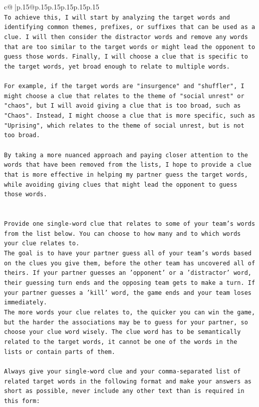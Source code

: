\documentclass{article}
\begin{document}
{\begin{supertabular}{c@{$\;$}|p{.15\linewidth}@{}p{.15\linewidth}p{.15\linewidth}p{.15\linewidth}p{.15\linewidth}p{.15\linewidth}}
{{{\\ 
\texttt{To achieve this, I will start by analyzing the target words and identifying common themes, prefixes, or suffixes that can be used as a clue. I will then consider the distractor words and remove any words that are too similar to the target words or might lead the opponent to guess those words. Finally, I will choose a clue that is specific to the target words, yet broad enough to relate to multiple words.} \\
\\ 
\texttt{For example, if the target words are "insurgence" and "shuffler", I might choose a clue that relates to the theme of "social unrest" or "chaos", but I will avoid giving a clue that is too broad, such as "Chaos". Instead, I might choose a clue that is more specific, such as "Uprising", which relates to the theme of social unrest, but is not too broad.} \\
\\ 
\texttt{By taking a more nuanced approach and paying closer attention to the words that have been removed from the lists, I hope to provide a clue that is more effective in helping my partner guess the target words, while avoiding giving clues that might lead the opponent to guess those words.} \\
\\ 
\\ 
\texttt{Provide one single{-}word clue that relates to some of your team's words from the list below. You can choose to how many and to which words your clue relates to.} \\
\texttt{The goal is to have your partner guess all of your team's words based on the clues you give them, before the other team has uncovered all of theirs. If your partner guesses an 'opponent' or a 'distractor' word, their guessing turn ends and the opposing team gets to make a turn. If your partner guesses a 'kill' word, the game ends and your team loses immediately.} \\
\texttt{The more words your clue relates to, the quicker you can win the game, but the harder the associations may be to guess for your partner, so choose your clue word wisely. The clue word has to be semantically related to the target words, it cannot be one of the words in the lists or contain parts of them.} \\
\\ 
\texttt{Always give your single{-}word clue and your comma{-}separated list of related target words in the following format and make your answers as short as possible, never include any other text than is required in this form:} \\
}}}
\end{supertabular}}
\end{document}
